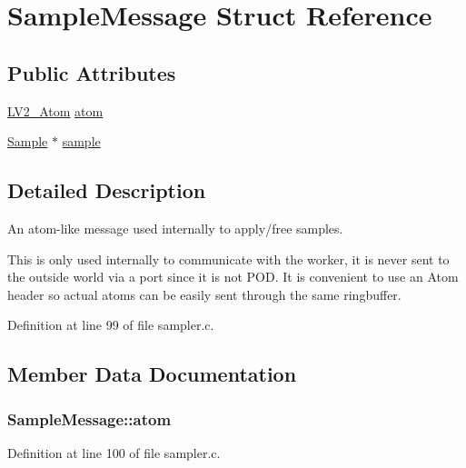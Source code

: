 \hypertarget{struct_sample_message}{}\section{Sample\+Message Struct Reference}
\label{struct_sample_message}
\subsection*{Public Attributes}
\begin{DoxyCompactItemize}
\item 
\hyperlink{struct_l_v2___atom}{L\+V2\+\_\+\+Atom} \hyperlink{struct_sample_message_a4573e699ac5778fcaa20659eedc56b98}{atom}
\item 
\hyperlink{struct_sample}{Sample} $\ast$ \hyperlink{struct_sample_message_a22c0861fe3a8b5d0569509fe1ea58b66}{sample}
\end{DoxyCompactItemize}


\subsection{Detailed Description}
An atom-\/like message used internally to apply/free samples.

This is only used internally to communicate with the worker, it is never sent to the outside world via a port since it is not P\+OD. It is convenient to use an Atom header so actual atoms can be easily sent through the same ringbuffer. 

Definition at line 99 of file sampler.\+c.



\subsection{Member Data Documentation}
\subsubsection[{\texorpdfstring{atom}{atom}}]{ Sample\+Message\+::atom}\hypertarget{struct_sample_message_a4573e699ac5778fcaa20659eedc56b98}{}\label{struct_sample_message_a4573e699ac5778fcaa20659eedc56b98}


Definition at line 100 of file sampler.\+c.

